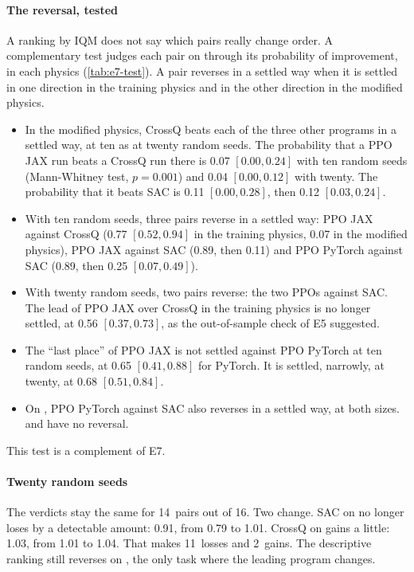 \paragraph{The reversal, tested}
A ranking by IQM does not say which pairs really change order. A complementary test judges each pair on
 through its probability of improvement, in each physics
(\cref{tab:e7-test}).
A pair reverses in a settled way when it is settled in one direction in the training physics and in the other
direction in the modified physics.
\begin{itemize}
  \item In the modified physics, CrossQ beats each of the three other programs in a settled way, at ten as at
    twenty random seeds. The probability that a PPO JAX run beats a CrossQ run there is 0.07 $[0.00, 0.24]$
    with ten random seeds (Mann-Whitney test, $p = 0.001$) and 0.04 $[0.00, 0.12]$ with twenty. The
    probability that it beats SAC is 0.11 $[0.00, 0.28]$, then 0.12 $[0.03, 0.24]$.
  \item With ten random seeds, three pairs reverse in a settled way: PPO JAX against CrossQ (0.77
    $[0.52, 0.94]$ in the training physics, 0.07 in the modified physics), PPO JAX against SAC (0.89, then
    0.11) and PPO PyTorch against SAC (0.89, then 0.25 $[0.07, 0.49]$).
  \item With twenty random seeds, two pairs reverse: the two PPOs against SAC. The lead of PPO JAX over CrossQ
    in the training physics is no longer settled, at 0.56 $[0.37, 0.73]$, as the out-of-sample check of E5
    suggested.
  \item The \enquote{last place} of PPO JAX is not settled against PPO PyTorch at ten random seeds, at 0.65
    $[0.41, 0.88]$ for PyTorch. It is settled, narrowly, at twenty, at 0.68 $[0.51, 0.84]$.
  \item On , PPO PyTorch against SAC also reverses in a settled way, at both sizes.
     and  have no reversal.
\end{itemize}
This test is a complement of E7.


\paragraph{Twenty random seeds}
The verdicts stay the same for 14~pairs out of 16. Two change. SAC on  no longer loses by a
detectable amount: 0.91, from 0.79 to 1.01. CrossQ on  gains a little: 1.03, from 1.01 to 1.04.
That makes 11~losses and 2~gains. The descriptive ranking still reverses on , the only task where
the leading program changes.

